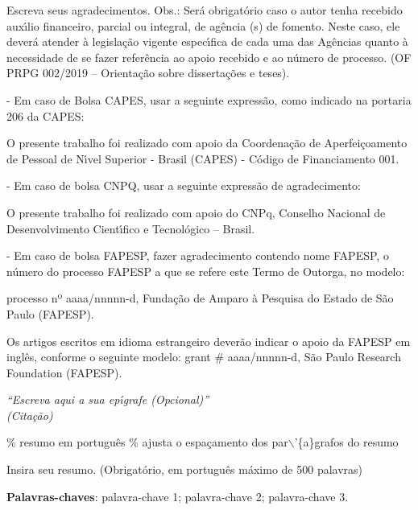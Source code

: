 \documentclass[11pt]{article}
\begin{document}
\begin{agradecimentos}
    Escreva seus agradecimentos.
    Obs.: Ser\'{a} obrigat\'{o}rio caso o autor tenha recebido aux\'{\i}lio financeiro, parcial ou integral, de ag\^{e}ncia (s) de fomento. Neste caso, ele dever\'{a} atender \`{a} legisla\c{c}\~{a}o vigente espec\'{\i}fica de cada uma das Ag\^{e}ncias quanto \`{a} necessidade de se fazer refer\^{e}ncia ao apoio recebido e ao n\'{u}mero de processo. (OF PRPG 002/2019 – Orienta\c{c}\~{a}o sobre disserta\c{c}\~{o}es e teses).

    -	Em caso de Bolsa CAPES, usar a seguinte express\~{a}o, como indicado na portaria 206 da CAPES:

    O presente trabalho foi realizado com apoio da Coordena\c{c}\~{a}o de Aperfei\c{c}oamento de Pessoal de N\'{\i}vel Superior - Brasil (CAPES) - C\'{o}digo de Financiamento 001.

    -	Em caso de bolsa CNPQ, usar a seguinte express\~{a}o de agradecimento:

    O presente trabalho foi realizado com apoio do CNPq, Conselho Nacional de Desenvolvimento Cient\'{\i}fico  e Tecnol\'{o}gico – Brasil.

    -	Em caso de bolsa FAPESP, fazer agradecimento contendo nome FAPESP, o n\'{u}mero do processo FAPESP a que se refere este Termo de Outorga, no modelo:

    processo nº aaaa/nnnnn-d, Funda\c{c}\~{a}o de Amparo \`{a} Pesquisa do Estado de S\~{a}o Paulo (FAPESP).

    Os artigos escritos em idioma estrangeiro dever\~{a}o indicar o apoio da FAPESP em ingl\^{e}s, conforme o seguinte modelo: grant \# aaaa/nnnnn-d, S\~{a}o Paulo Research Foundation (FAPESP).
\end{agradecimentos}


\begin{epigrafe}
    \vspace*{\fill}
    \begin{flushright}
        \textit{``Escreva aqui a sua ep\'{\i}grafe (Opcional)''\\
        (Cita\c{c}\~{a}o)}
    \end{flushright}
\end{epigrafe}


\% resumo em português
\setlength{\absparsep}{18pt} \% ajusta o espa\c{c}amento dos par$\backslash$'\{a\}grafos do resumo
\begin{resumo}
 Insira seu resumo. (Obrigat\'{o}rio, em portugu\^{e}s m\'{a}ximo de 500 palavras)

	\lipsum[1]

    \vspace{\onelineskip}

    \noindent\textbf{Palavras-chaves}: palavra-chave 1; palavra-chave 2; palavra-chave 3.
\end{resumo}
\end{document}
